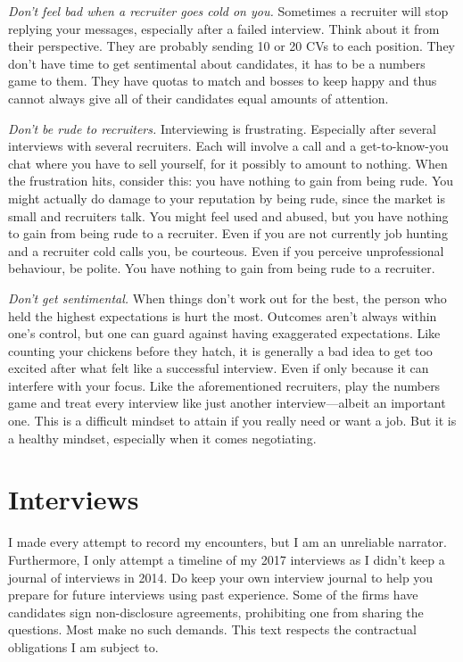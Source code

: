 \documentclass[a4paper]{article}
\begin{document}
\emph{Don't feel bad when a recruiter goes cold on you.}
Sometimes a recruiter will stop replying your messages, especially after a failed interview.
Think about it from their perspective.
They are probably sending 10 or 20 CVs to each position.
They don't have time to get sentimental about candidates, it has to be a numbers game to them.
They have quotas to match and bosses to keep happy and thus cannot always give all of their candidates equal amounts of attention.

\emph{Don't be rude to recruiters.}
Interviewing is frustrating. Especially after several interviews with several recruiters.
Each will involve a call and a get-to-know-you chat where you have to sell yourself, for it possibly to amount to nothing.
When the frustration hits, consider this:
you have nothing to gain from being rude.
You might actually do damage to your reputation by being rude, since the market is small and recruiters talk.
You might feel used and abused, but
you have nothing to gain from being rude to a recruiter.
Even if you are not currently job hunting and a recruiter cold calls you, be courteous.
Even if you perceive unprofessional behaviour, be polite.
You have nothing to gain from being rude to a recruiter.

\emph{Don't get sentimental.}
When things don't work out for the best, the person who held the highest expectations is hurt the most.
Outcomes aren't always within one's control, but one can guard against having exaggerated expectations.
Like counting your chickens before they hatch, it is generally a bad idea to get too excited after  what felt like a successful interview.
Even if only because it can interfere with your focus.
Like the aforementioned recruiters, play the numbers game and treat every interview like just another interview---albeit an important one.
This is a difficult mindset to attain if you really need or want a job.
But it is a healthy mindset, especially when it comes negotiating.


\section{Interviews}

I made every attempt to record my encounters, but I am an unreliable narrator.
Furthermore, I only attempt a timeline of my 2017 interviews as I didn't keep a journal of interviews in 2014.
Do keep your own interview journal to help you prepare for future interviews using past experience.
Some of the firms have candidates sign non-disclosure agreements, prohibiting one from sharing the questions.
Most make no such demands.
This text respects the contractual obligations I am subject to.
\end{document}
